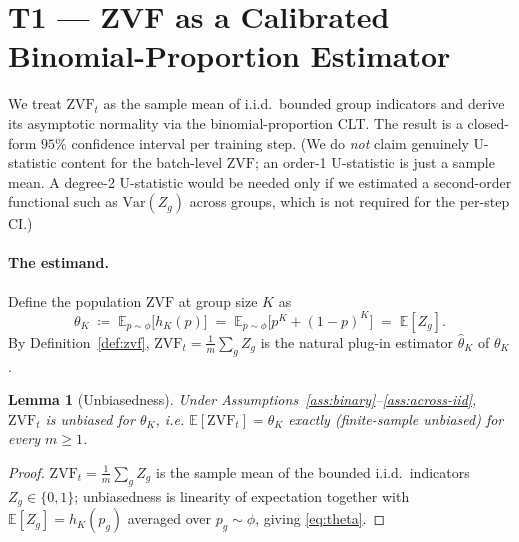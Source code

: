 \documentclass[11pt]{article}
\theoremstyle{plain}
\newtheorem{lemma}{Lemma}
\theoremstyle{definition}
\theoremstyle{remark}
\newcommand{\ZVF}{\ensuremath{\mathrm{ZVF}}}
\newcommand{\Var}{\ensuremath{\mathrm{Var}}}
\newcommand{\E}{\mathbb{E}}
\newcommand{\1}{\mathbb{1}}
\begin{document}
\section{T1 --- ZVF as a Calibrated Binomial-Proportion Estimator}\label{sec:T1}
We treat $\ZVF_t$ as the sample mean of i.i.d.\ bounded group indicators and
derive its asymptotic normality via the binomial-proportion CLT. The result is
a closed-form $95\%$ confidence interval per training step. (We do \emph{not}
claim genuinely U-statistic content for the batch-level \ZVF{}; an order-1
U-statistic is just a sample mean. A degree-2 U-statistic would be needed only
if we estimated a second-order functional such as $\Var(Z_g)$ across groups,
which is not required for the per-step CI.)

\paragraph{The estimand.} Define the population \ZVF{} at group size $K$ as
\begin{equation}\label{eq:theta}
\theta_K \;\coloneqq\; \E_{p\sim\phi}\big[h_K(p)\big]
\;=\; \E_{p\sim\phi}\big[p^{K}+(1-p)^{K}\big] \;=\; \E[Z_g].
\end{equation}
By Definition~\ref{def:zvf}, $\ZVF_t = \frac1m\sum_{g} Z_g$ is the natural
plug-in estimator $\widehat\theta_K$ of $\theta_K$.

\begin{lemma}[Unbiasedness]\label{lem:ustat}
Under Assumptions~\ref{ass:binary}--\ref{ass:across-iid}, $\ZVF_t$ is
unbiased for $\theta_K$, i.e. $\E[\ZVF_t]=\theta_K$ exactly (finite-sample
unbiased) for every $m\ge 1$.
\end{lemma}
\begin{proof}
$\ZVF_t = \frac1m\sum_g Z_g$ is the sample mean of the bounded i.i.d.\
indicators $Z_g\in\{0,1\}$; unbiasedness is linearity of expectation
together with $\E[Z_g]=h_K(p_g)$ averaged over $p_g\sim\phi$, giving
\eqref{eq:theta}.
\end{proof}
\end{document}
